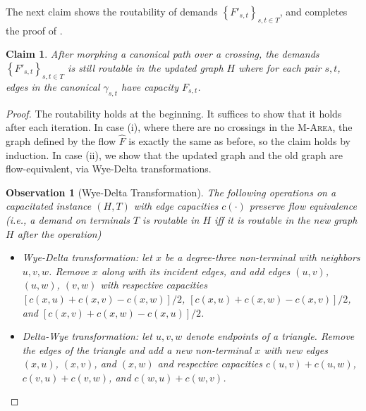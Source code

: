 \documentclass[11pt]{article}
\newtheorem{observation}[theorem]{Observation}
\newtheorem{claim}[theorem]{Claim}
\newcommand{\set}[1]{\left\{ #1 \right\}}
\begin{document}
The next claim shows the routability of demands $\set{F'_{s,t}}_{s,t\in T}$, and completes the proof of .

\begin{claim}
After morphing a canonical path over a crossing, the demands $\set{F'_{s,t}}_{s,t\in T}$ is still routable in the updated graph $H$ where for each pair $s,t$, edges in the canonical $\gamma_{s,t}$ have capacity $F_{s,t}$.
\end{claim}
\begin{proof}
The routability holds at the beginning. It suffices to show that it holds after each iteration.
In case (i), where there are no crossings in the \textsc{M-Area}, the graph defined by the flow $\hat{F}$ is exactly the same as before, so the claim holds by induction. In case (ii), we show that the updated graph and the old graph  are flow-equivalent, via Wye-Delta transformations.
    \begin{observation}[Wye-Delta Transformation]
        The following operations on a capacitated instance $(H,T)$ with edge capacities $c(\cdot)$ preserve flow equivalence (i.e., a demand on terminals $T$ is routable in $H$ iff it is routable in the new graph $H$ after the operation)
        \begin{itemize}
            \item Wye-Delta transformation: let $x$ be a degree-three non-terminal with neighbors $u,v,w$. Remove $x$ along with its incident edges, and add edges $(u,v)$, $(u,w)$, $(v,w)$ with respective capacities $[c(x,u)+c(x,v)-c(x,w)]/2$, $[c(x,u)+c(x,w)-c(x,v)]/2$, and $[c(x,v)+c(x,w)-c(x,u)]/2$.
            \item Delta-Wye transformation: let $u,v,w$ denote endpoints of a triangle. Remove the edges of the triangle and add a new non-terminal $x$ with new edges $(x,u)$, $(x,v)$, and $(x,w)$ and respective capacities $c(u,v)+c(u,w)$, $c(v,u)+c(v,w)$, and $c(w,u)+c(w,v)$.
        \end{itemize}

\end{observation}
\end{proof}
\end{document}
